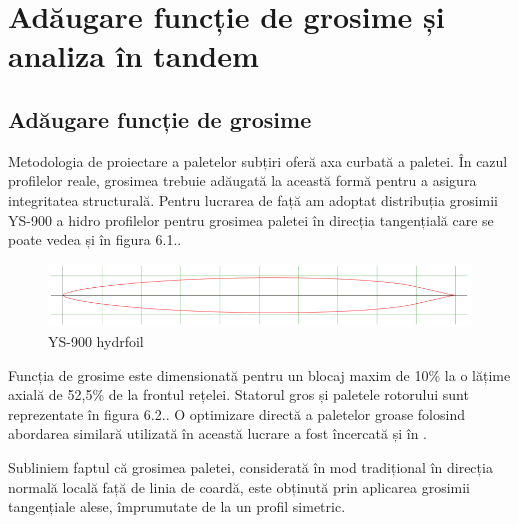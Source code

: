 \chapter{Adăugare funcție de grosime și analiza în tandem}\label{chapter:grosime}

\section{Adăugare funcție de grosime}

Metodologia de proiectare a paletelor subțiri oferă axa curbată a paletei. În cazul profilelor reale, grosimea trebuie adăugată la această formă pentru a asigura integritatea structurală. Pentru lucrarea de față am adoptat distribuția grosimii YS-900 a hidro profilelor \cite{eppler1979wing} pentru grosimea paletei în direcția tangențială care se poate vedea și în figura 6.1..

\begin{figure}[h]
	\centering
	\includegraphics[scale=0.5]{figures/airfoil-YS-900.png}
	\caption{YS-900 hydrfoil \cite{http://airfoiltools.com/airfoil/details?airfoil=ys900-il}}
	\label{YS-900 hydrfoil}
\end{figure}

Funcția de grosime este dimensionată pentru un blocaj maxim de 10\% la o lățime axială de 52,5\% de la frontul rețelei. Statorul gros și paletele rotorului sunt reprezentate în figura 6.2.. O optimizare directă a paletelor groase folosind abordarea similară utilizată în această lucrare a fost încercată și în \cite{frunzua2010optimization}.

Subliniem faptul că grosimea paletei, considerată în mod tradițional în direcția normală locală față de linia de coardă, este obținută prin aplicarea grosimii tangențiale alese, împrumutate de la un profil simetric.

